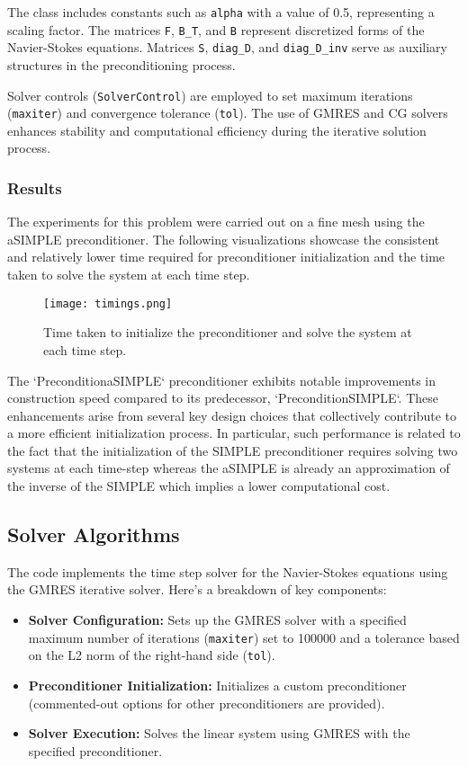 \documentclass{article}
\begin{document}
The class includes constants such as \texttt{alpha} with a value of 0.5, representing a scaling factor. The matrices \texttt{F}, \texttt{B\_T}, and \texttt{B} represent discretized forms of the Navier-Stokes equations. Matrices \texttt{S}, \texttt{diag\_D}, and \texttt{diag\_D\_inv} serve as auxiliary structures in the preconditioning process.

Solver controls (\texttt{SolverControl}) are employed to set maximum iterations (\texttt{maxiter}) and convergence tolerance (\texttt{tol}). The use of GMRES and CG solvers enhances stability and computational efficiency during the iterative solution process.
\subsubsection{Results}
The experiments for this problem were carried out on a fine mesh using the aSIMPLE preconditioner. The following visualizations showcase the consistent and relatively lower time required for preconditioner initialization and the time taken to solve the system at each time step.

\begin{figure}[h]
    \centering
    \texttt{[image: timings.png]}
    \caption{Time taken to initialize the preconditioner and solve the system at each time step.}
\end{figure}
The `PreconditionaSIMPLE` preconditioner exhibits notable improvements in construction speed compared to its predecessor, `PreconditionSIMPLE`. These enhancements arise from several key design choices that collectively contribute to a more efficient initialization process. In particular, such performance is related to the fact that the initialization of the SIMPLE preconditioner requires solving two systems at each time-step whereas the aSIMPLE is already an approximation of the inverse of the SIMPLE which implies a lower computational cost.


\subsection{Solver Algorithms}

The code implements the time step solver for the Navier-Stokes equations using the GMRES iterative solver. Here's a breakdown of key components:

\begin{itemize}
  \item \textbf{Solver Configuration:} Sets up the GMRES solver with a specified maximum number of iterations (\texttt{maxiter}) set to 100000 and a tolerance based on the L2 norm of the right-hand side (\texttt{tol}).
  \item \textbf{Preconditioner Initialization:} Initializes a custom preconditioner (commented-out options for other preconditioners are provided).
  \item \textbf{Solver Execution:} Solves the linear system using GMRES with the specified preconditioner.
\end{itemize}
\end{document}

